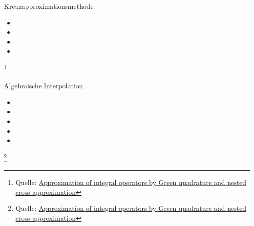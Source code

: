 \documentclass[10pt]{beamer}
\let\svthefootnote\thefootnote
\begin{document}
\begin{frame}{Kreuzapproximationsmethode}
  \begin{itemize}
    \item {}
    \item[] 
    \item {}
    \item {}
  \end{itemize}

  \footnotesize
  \let\thefootnote\relax\footnote{Quelle: \href{https://link.springer.com/article/10.1007\%2Fs00211-015-0757-y}{Approximation of integral operators by Green quadrature and nested cross approximation}}
  \addtocounter{footnote}{-1}\let\thefootnote\svthefootnote\relax
  \normalsize
\end{frame}

\begin{frame}{Algebraische Interpolation}
  \begin{itemize}
    \item {}
    \item[] 
    \item {}
    \item {}
    \item {}
  \end{itemize}

  \footnotesize
  \let\thefootnote\relax\footnote{Quelle: \href{https://link.springer.com/article/10.1007\%2Fs00211-015-0757-y}{Approximation of integral operators by Green quadrature and nested cross approximation}}
  \addtocounter{footnote}{-1}\let\thefootnote\svthefootnote\relax
  \normalsize
\end{frame}
\end{document}
